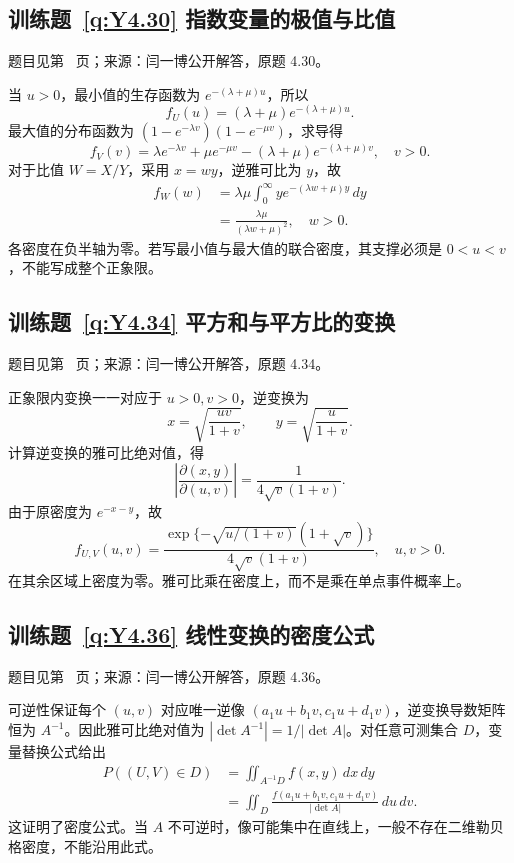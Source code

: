 \subsection*{训练题~\ref{q:Y4.30} 指数变量的极值与比值}\label{a:Y4.30}{\small 题目见第~\pageref{q:Y4.30} 页；来源：闫一博公开解答，原题 4.30。}
\begin{solve}当 $u>0$，最小值的生存函数为 $e^{-(\lambda+\mu)u}$，所以\[f_U(u)=(\lambda+\mu)e^{-(\lambda+\mu)u}.\]最大值的分布函数为 $(1-e^{-\lambda v})(1-e^{-\mu v})$，求导得\[f_V(v)=\lambda e^{-\lambda v}+\mu e^{-\mu v}-(\lambda+\mu)e^{-(\lambda+\mu)v},\quad v>0.\]对于比值 $W=X/Y$，采用 $x=wy$，逆雅可比为 $y$，故\[\begin{aligned}f_W(w)&=\lambda\mu\int_0^\infty ye^{-(\lambda w+\mu)y}\,dy\\&=\frac{\lambda\mu}{(\lambda w+\mu)^2},\quad w>0.\end{aligned}\]各密度在负半轴为零。若写最小值与最大值的联合密度，其支撑必须是 $0<u<v$，不能写成整个正象限。\end{solve}

\subsection*{训练题~\ref{q:Y4.34} 平方和与平方比的变换}\label{a:Y4.34}{\small 题目见第~\pageref{q:Y4.34} 页；来源：闫一博公开解答，原题 4.34。}
\begin{solve}正象限内变换一一对应于 $u>0,v>0$，逆变换为\[x=\sqrt{\frac{uv}{1+v}},\qquad y=\sqrt{\frac{u}{1+v}}.\]计算逆变换的雅可比绝对值，得\[\left|\frac{\partial(x,y)}{\partial(u,v)}\right|=\frac{1}{4\sqrt v(1+v)}.\]由于原密度为 $e^{-x-y}$，故\[f_{U,V}(u,v)=\frac{\exp\{-\sqrt{u/(1+v)}(1+\sqrt v)\}}{4\sqrt v(1+v)},\quad u,v>0.\]在其余区域上密度为零。雅可比乘在密度上，而不是乘在单点事件概率上。\end{solve}

\subsection*{训练题~\ref{q:Y4.36} 线性变换的密度公式}\label{a:Y4.36}{\small 题目见第~\pageref{q:Y4.36} 页；来源：闫一博公开解答，原题 4.36。}
\begin{solve}可逆性保证每个 $(u,v)$ 对应唯一逆像 $(a_1u+b_1v,c_1u+d_1v)$，逆变换导数矩阵恒为 $A^{-1}$。因此雅可比绝对值为 $|\det A^{-1}|=1/|\det A|$。对任意可测集合 $D$，变量替换公式给出\[\begin{aligned}P((U,V)\in D)&=\iint_{A^{-1}D}f(x,y)\,dx\,dy\\&=\iint_D\frac{f(a_1u+b_1v,c_1u+d_1v)}{|\det A|}\,du\,dv.\end{aligned}\]这证明了密度公式。当 $A$ 不可逆时，像可能集中在直线上，一般不存在二维勒贝格密度，不能沿用此式。\end{solve}

